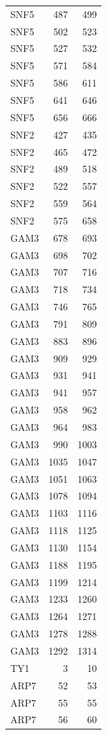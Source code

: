 \begin{longtable}{@{}lrr@{}}
  SNF5 & 487 & 499 \\
  SNF5 & 502 & 523 \\
  SNF5 & 527 & 532 \\
  SNF5 & 571 & 584 \\
  SNF5 & 586 & 611 \\
  SNF5 & 641 & 646 \\
  SNF5 & 656 & 666 \\
  SNF2 & 427 & 435 \\
  SNF2 & 465 & 472 \\
  SNF2 & 489 & 518 \\
  SNF2 & 522 & 557 \\
  SNF2 & 559 & 564 \\
  SNF2 & 575 & 658 \\
  GAM3 & 678 & 693 \\
  GAM3 & 698 & 702 \\
  GAM3 & 707 & 716 \\
  GAM3 & 718 & 734 \\
  GAM3 & 746 & 765 \\
  GAM3 & 791 & 809 \\
  GAM3 & 883 & 896 \\
  GAM3 & 909 & 929 \\
  GAM3 & 931 & 941 \\
  GAM3 & 941 & 957 \\
  GAM3 & 958 & 962 \\
  GAM3 & 964 & 983 \\
  GAM3 & 990 & 1003 \\
  GAM3 & 1035 & 1047 \\
  GAM3 & 1051 & 1063 \\
  GAM3 & 1078 & 1094 \\
  GAM3 & 1103 & 1116 \\
  GAM3 & 1118 & 1125 \\
  GAM3 & 1130 & 1154 \\
  GAM3 & 1188 & 1195 \\
  GAM3 & 1199 & 1214 \\
  GAM3 & 1233 & 1260 \\
  GAM3 & 1264 & 1271 \\
  GAM3 & 1278 & 1288 \\
  GAM3 & 1292 & 1314 \\
  TY1 & 3 & 10 \\
  ARP7 & 52 & 53 \\
  ARP7 & 55 & 55 \\
  ARP7 & 56 & 60 \\

\end{longtable}
